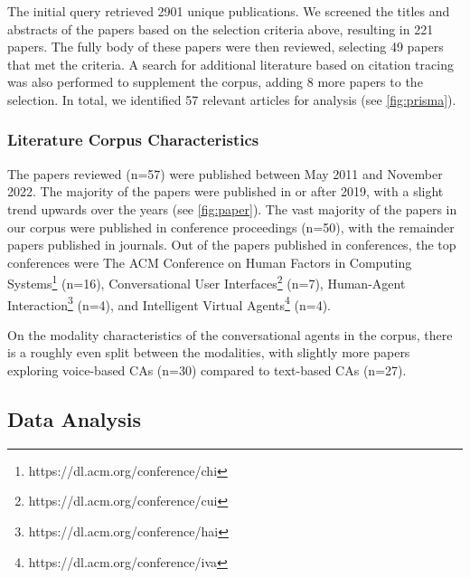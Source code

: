 The initial query retrieved 2901 unique publications. We screened the titles and abstracts of the papers based on the selection criteria above, resulting in 221 papers. The fully body of these papers were then reviewed, selecting 49 papers that met the criteria. A search for additional literature based on citation tracing was also performed to supplement the corpus, adding 8 more papers to the selection. In total, we identified 57 relevant articles for analysis (see \autoref{fig:prisma}).



\subsubsection*{Literature Corpus Characteristics}

The papers reviewed (n=57) were published between May 2011 and November 2022. The majority of the papers were published in or after 2019, with a slight trend upwards over the years (see \autoref{fig:paper}). The vast majority of the papers in our corpus were published in conference proceedings (n=50), with the remainder papers published in journals. Out of the papers published in conferences, the top conferences were The ACM Conference on Human Factors in Computing Systems\footnote{https://dl.acm.org/conference/chi} (n=16), Conversational User Interfaces\footnote{https://dl.acm.org/conference/cui} (n=7), Human-Agent Interaction\footnote{https://dl.acm.org/conference/hai} (n=4), and Intelligent Virtual Agents\footnote{https://dl.acm.org/conference/iva} (n=4). 

On the modality characteristics of the conversational agents in the corpus, there is a roughly even split between the modalities, with slightly more papers exploring voice-based CAs (n=30) compared to text-based CAs (n=27).



\subsection{Data Analysis}

